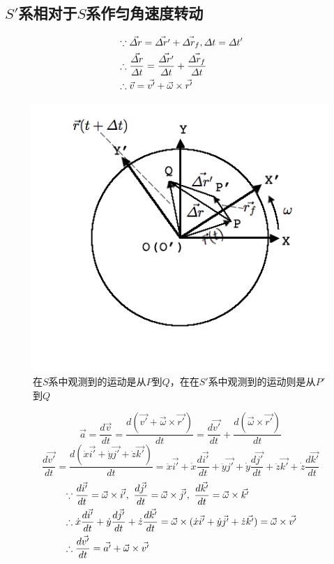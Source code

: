 \subsection{$S'$系相对于$S$系作匀角速度转动}
\begin{align}
&\because \vec{\varDelta r} = \vec{\varDelta r'}+\vec{\varDelta r_f},\varDelta t = \varDelta t' \notag \\
&\therefore \frac{\vec{\varDelta r}}{\varDelta t} =\frac{\vec{\varDelta r'}}{\varDelta t}+\frac{\vec{\varDelta r_f}}{\varDelta t} \notag  \\
&\therefore \vec{v} =\vec{v'}+\vec{\omega}\times\vec{r'} \notag
\end{align}

\begin{figure} [ht]
\centering
\includegraphics[scale=0.5]{frame_transform2.png}
\caption{\simsun 在$S$系中观测到的运动是从$P$到$Q$，在在$S'$系中观测到的运动则是从$P'$到$Q$}
\label{frame_transform2.png}
\end{figure}
\[\vec{a}=\frac{d\vec{v}}{dt}=\frac{d(\vec{v'}+\vec{\omega}\times\vec{r'})}{dt}=\frac{d\vec{v'}}{dt}+\frac{d(\vec{\omega}\times\vec{r'})}{dt}\]
\[\frac{d\vec{v'}}{dt}=\frac{d(\dot{x}\vec{i'}+\dot{y}\vec{j'}+\dot{z}\vec{k'})}{dt}=\ddot{x}\vec{i'}+\dot{x}\frac{d\vec{i'}}{dt}+\ddot{y}\vec{j'}+\dot{y}\frac{d\vec{j'}}{dt}+\ddot{z}\vec{k'}+\dot{z}\frac{d\vec{k'}}{dt}\]
\begin{align}
&\because \frac{d\vec{i'}}{dt}=\vec{\omega}\times\vec{i'},\ \frac{d\vec{j'}}{dt}=\vec{\omega}\times\vec{j'},\ \frac{d\vec{k'}}{dt}=\vec{\omega}\times\vec{k'} \notag \\
&\therefore \dot{x}\frac{d\vec{i'}}{dt}+\dot{y}\frac{d\vec{j'}}{dt}+\dot{z}\frac{d\vec{k'}}{dt} = \vec{\omega}\times(\dot{x}\vec{i'}+\dot{y}\vec{j'}+\dot{z}\vec{k'})= \vec{\omega}\times\vec{v'}\notag \\
&\therefore \frac{d\vec{v'}}{dt}=\vec{a'}+\vec{\omega}\times\vec{v'}\notag
\end{align}
